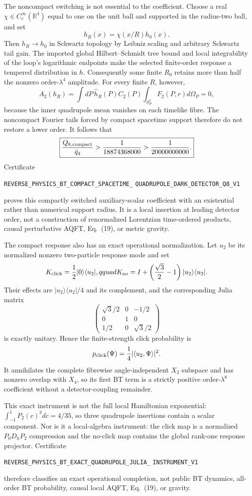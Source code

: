 \documentclass[11pt]{article}
\theoremstyle{definition}
\theoremstyle{remark}
\begin{document}
The noncompact switching is not essential to the coefficient.  Choose a real
$\chi\in C_c^\infty(\mathbb R^4)$ equal to one on the unit ball and supported
in the radius-two ball, and set
\[
 h_R(x)=\chi(x/R)h_0(x).
\]
Then
$h_R\to h_0$ in Schwartz topology by Leibniz scaling and arbitrary Schwartz
tail gain.  The imported global Hilbert--Schmidt tree bound and local
integrability of the loop's logarithmic endpoints make the selected
finite-order response a tempered distribution in $h$.  Consequently some
finite $R_0$ retains more than half the nonzero order-$\lambda^4$ amplitude.
For every finite $R$, however,
\[
 A_2(h_R)=\int dP\,\widehat h_R(P)C_2(P)
 \int_{S_P^2}F_2(P,r)d\Omega_P=0,
\]
because the inner quadrupole mean vanishes on each timelike fibre.  The
noncompact Fourier tails forced by compact spacetime support therefore do not
restore a lower order.  It follows that
\[
 \boxed{{Q_{8,\mathrm{compact}}\over\bar q_4}
 >{1\over18874368000}>{1\over20000000000}.}
\]
Certificate
\par\noindent
\texttt{REVERSE\_PHYSICS\_BT\_COMPACT\_SPACETIME\_}
\allowbreak\texttt{QUADRUPOLE\_DARK\_DETECTOR\_Q8\_V1}
\par\noindent
proves this compactly switched auxiliary-scalar coefficient with an
existential rather than numerical support radius.  It is a local insertion
at leading detector order, not a construction of renormalized Lorentzian
time-ordered products, causal perturbative AQFT, Eq.~(19), or metric gravity.

The compact response also has an exact operational normalization.  Let
$u_2$ be its normalized nonzero two-particle response mode and set
\[
 K_{\rm click}={1\over2}|0\rangle\langle u_2|,qquad
 K_{\rm no}=I+\left({\sqrt3\over2}-1\right)|u_2\rangle\langle u_2|.
\]
Their effects are $|u_2\rangle\langle u_2|/4$ and its complement, and the
corresponding Julia matrix
\[
 \begin{pmatrix}
 \sqrt3/2&0&-1/2\\0&1&0\\1/2&0&\sqrt3/2
 \end{pmatrix}
\]
is exactly unitary.  Hence the finite-strength click probability is
\[
 p_{\rm click}(\Psi)={1\over4}|\langle u_2,\Psi\rangle|^2.
\]
It annihilates the complete fibrewise angle-independent $X_2$ subspace and
has nonzero overlap with $X_4$, so its first BT term is a strictly positive
order-$\lambda^8$ coefficient without a detector-coupling remainder.

This exact instrument is not the full local Hamiltonian exponential:
$\int_{-1}^{1}P_2(c)^3dc=4/35$, so three quadrupole insertions contain a
scalar component.  Nor is it a local-algebra instrument: the click map is a
normalized $P_0D_hP_2$ compression and the no-click map contains the global
rank-one response projector.  Certificate
\par\noindent
\texttt{REVERSE\_PHYSICS\_BT\_EXACT\_QUADRUPOLE\_JULIA\_}
\allowbreak\texttt{INSTRUMENT\_V1}
\par\noindent
therefore classifies an exact operational completion, not public BT
dynamics, all-order BT probability, causal local AQFT, Eq.~(19), or gravity.
\end{document}
